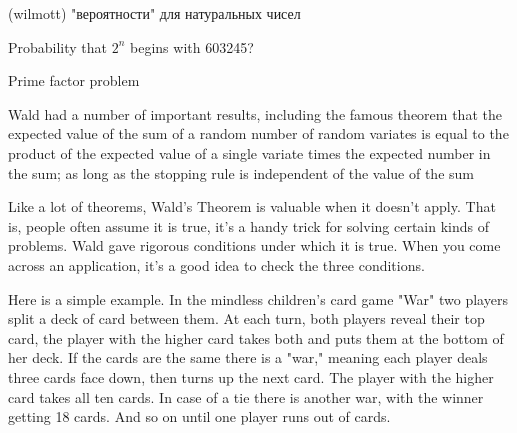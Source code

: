 (wilmott) "вероятности" для натуральных чисел \par
Probability that $2^n$ begins with 603245? \par
Prime factor problem \par







Wald had a number of important results, including the famous theorem that the expected value of the sum of a random number of random variates is equal to the product of the expected value of a single variate times the expected number in the sum; as long as the stopping rule is independent of the value of the sum \par
Like a lot of theorems, Wald's Theorem is valuable when it doesn't apply. That is, people often assume it is true, it's a handy trick for solving certain kinds of problems. Wald gave rigorous conditions under which it is true. When you come across an application, it's a good idea to check the three conditions.

Here is a simple example. In the mindless children's card game "War" two players split a deck of card between them. At each turn, both players reveal their top card, the player with the higher card takes both and puts them at the bottom of her deck. If the cards are the same there is a "war," meaning each player deals three cards face down, then turns up the next card. The player with the higher card takes all ten cards. In case of a tie there is another war, with the winner getting 18 cards. And so on until one player runs out of cards.

